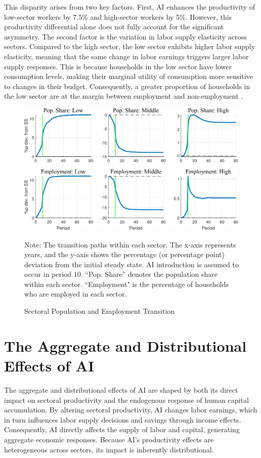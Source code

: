 \documentclass[12pt]{article}
\begin{document}
This disparity arises from two key factors. First, AI enhances the productivity of low-sector workers by 7.5\% and high-sector workers by 5\%. However, this productivity differential alone does not fully account for the significant asymmetry. The second factor is the variation in labor supply elasticity across sectors. Compared to the high sector, the low sector exhibits higher labor supply elasticity, meaning that the same change in labor earnings triggers larger labor supply responses. This is because households in the low sector have lower consumption levels, making their marginal utility of consumption more sensitive to changes in their budget. Consequently, a greater proportion of households in the low sector are at the margin between employment and non-employment \citep{Chang2006}.


\begin{figure}
    \begin{centering}
    \caption{Sectoral Population and Employment Transition}
    \includegraphics[width=1\linewidth]{figure_204040calib/share}
    \label{fig:tr_share}
    \end{centering}\par
    {\scriptsize Note: The transition paths within each sector. The x-axis represents years, and the y-axis shows the percentage (or percentage point) deviation from the initial steady state. AI introduction is assumed to occur in period 10. “Pop. Share” denotes the population share within each sector. “Employment" is the percentage of households who are employed in each sector.}{\scriptsize\par}
\end{figure}







\section{The Aggregate and Distributional Effects of AI}
The aggregate and distributional effects of AI are shaped by both its direct impact on sectoral productivity and the endogenous response of human capital accumulation. By altering sectoral productivity, AI changes labor earnings, which in turn influences labor supply decisions and savings through income effects. Consequently, AI directly affects the supply of labor and capital, generating aggregate economic responses. Because AI’s productivity effects are heterogeneous across sectors, its impact is inherently distributional.
\end{document}
